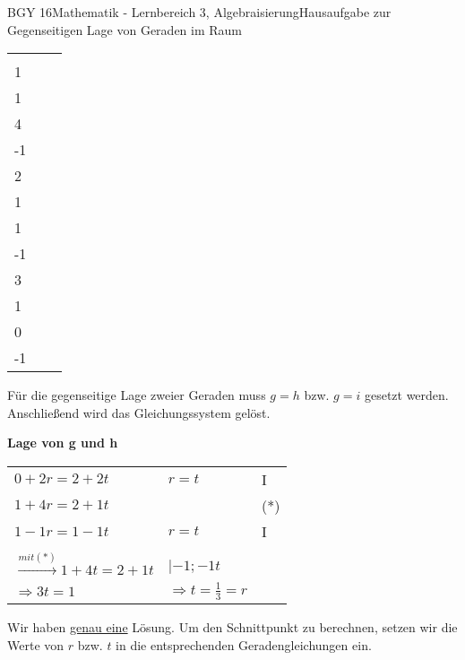 \documentclass[oneside,openany,headings=optiontotoc,11pt,numbers=noenddot]{scrreprt}
\begin{document}
\begin{worksheet}{BGY 16}{Mathematik - Lernbereich 3, Algebraisierung}{Hausaufgabe zur Gegenseitigen Lage von Geraden im Raum}
\begin{framed}
\begin{tabularx}{\textwidth}{X|X|X}
				\(g: \vec{x} = \left(\begin{array}{c}0\\1\\1\end{array}\right) + r\left(\begin{array}{c}2\\4\\-1\end{array}\right)\) & \(h: \vec{x} = \left(\begin{array}{c}0\\2\\1\end{array}\right) + t\left(\begin{array}{c}2\\1\\-1\end{array}\right)\) & \(i: \vec{x} = \left(\begin{array}{c}0\\3\\1\end{array}\right) + s\left(\begin{array}{c}2\\0\\-1\end{array}\right)\)
			\end{tabularx}
			Für die gegenseitige Lage zweier Geraden muss \(g=h\) bzw. \(g=i\) gesetzt werden. Anschließend wird das Gleichungssystem gelöst.\\
			\par\bigskip\noindent
			\textbf{Lage von g und h}\\
			\par\noindent
			\begin{tabularx}{\textwidth}{lll}
				\(0+2r = 2 + 2t\) & \(r=t\) & I\\
				\(1+4r = 2 + 1t\) & & (*)\\
				\(1-1r = 1-1t\) & \(r=t\) & I\\
				\hline\\
				\(\xrightarrow{mit (*)} 1+4t = 2+1t\) & |\(-1; -1t\)\\
				\(\Rightarrow 3t = 1\) & \(\Rightarrow t = \frac{1}{3} = r\)\\
			\end{tabularx}
			Wir haben \underline{genau eine} Lösung. Um den Schnittpunkt zu berechnen, setzen wir die Werte von \(r\) bzw. \(t\) in die entsprechenden Geradengleichungen ein.\\
			\begin{center}

\end{center}
\end{framed}
\end{worksheet}
\end{document}
